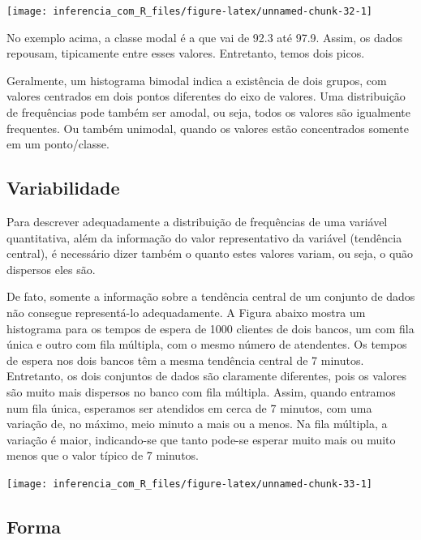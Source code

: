 \documentclass[
]{book}
\begin{document}
\begin{center}\texttt{[image: inferencia\_com\_R\_files/figure-latex/unnamed-chunk-32-1]} \end{center}

No exemplo acima, a classe modal é a que vai de 92.3 até 97.9. Assim, os dados repousam, tipicamente entre esses valores. Entretanto, temos dois picos.

Geralmente, um histograma bimodal indica a existência de dois grupos, com valores centrados em dois pontos diferentes do eixo de valores. Uma distribuição de frequências pode também ser amodal, ou seja, todos os valores são igualmente frequentes. Ou também unimodal, quando os valores estão concentrados somente em um ponto/classe.

\hypertarget{variabilidade}{%
\subsection{Variabilidade}\label{variabilidade}}

Para descrever adequadamente a distribuição de frequências de uma variável quantitativa, além da informação do valor representativo da variável (tendência central), é necessário dizer também o quanto estes valores variam, ou seja, o quão dispersos eles são.

De fato, somente a informação sobre a tendência central de um conjunto de dados não consegue representá-lo adequadamente. A Figura abaixo mostra um histograma para os tempos de espera de 1000 clientes de dois bancos, um com fila única e outro com fila múltipla, com o mesmo número de atendentes. Os tempos de espera nos dois bancos têm a mesma tendência central de 7 minutos. Entretanto, os dois conjuntos de dados são claramente diferentes, pois os valores são muito mais dispersos no banco com fila múltipla. Assim, quando entramos num fila única, esperamos ser atendidos em cerca de 7 minutos, com uma variação de, no máximo, meio minuto a mais ou a menos. Na fila múltipla, a variação é maior, indicando-se que tanto pode-se esperar muito mais ou muito menos que o valor típico de 7 minutos.

\begin{center}\texttt{[image: inferencia\_com\_R\_files/figure-latex/unnamed-chunk-33-1]} \end{center}

\hypertarget{forma}{%
\subsection{Forma}\label{forma}}
\end{document}
